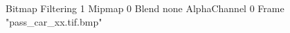 {Bitmap
	{Filtering 1}
	{Mipmap 0}
	{Blend none}
	{AlphaChannel 0}
	{Frame "pass_car_xx.tif.bmp"}
}
